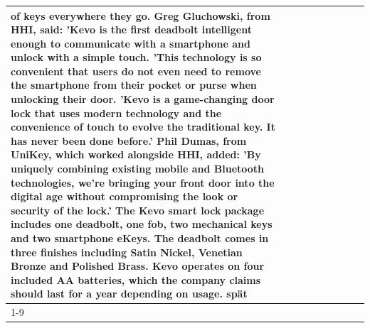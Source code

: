 \begin{table}[H]
\begin{tabular}{lllrlllll}
of keys everywhere they go. Greg Gluchowski, from HHI, said: 'Kevo is the first deadbolt intelligent enough to communicate with a smartphone and unlock with a simple touch. 'This technology is so convenient that users do not even need to remove the smartphone from their pocket or purse when unlocking their door. 'Kevo is a game-changing door lock that uses modern technology and the convenience of touch to evolve the traditional key. It has never been done before.' Phil Dumas, from UniKey, which worked alongside HHI, added: 'By uniquely combining existing mobile and Bluetooth technologies, we’re bringing your front door into the digital age without compromising the look or security of the lock.' The Kevo smart lock package includes one deadbolt, one fob, two mechanical keys and two smartphone eKeys. The deadbolt comes in three finishes including Satin Nickel, Venetian Bronze and Polished Brass. Kevo operates on four included AA batteries, which the company claims should last for a year depending on usage. spät \\
\cline{1-9}

\end{tabular}
\end{table}
